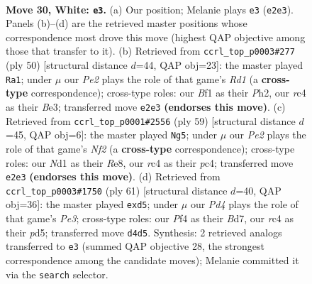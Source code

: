 \documentclass[11pt]{article}
\begin{document}
\clearpage

\begin{figure}[p]\centering
\begin{subfigure}{0.46\textwidth}\centering
\resizebox{\linewidth}{!}{%
\newchessgame
\chessboard[
  setfen={6k1/R4pp1/2b1p3/1p5p/1PrPnP1P/6P1/4P3/3N1BK1 w - - 3 30},
  showmover=false,
  pgfstyle=straightmove, color=movearrow, markmove={e2-e3}
]}
\caption{}
\end{subfigure}\hfill
\begin{subfigure}{0.46\textwidth}\centering
\resizebox{\linewidth}{!}{%
\newchessgame
\chessboard[
  setfen={1r4k1/2N1bpp1/4p3/2n1P2p/2p5/4B1P1/1P2PP1P/3R2K1 w - - 1 26},
  showmover=false,
  pgfstyle=straightmove, color=movearrow, markmove={d1-a1}
]}
\caption{}
\end{subfigure}
\\[4pt]
\begin{subfigure}{0.46\textwidth}\centering
\resizebox{\linewidth}{!}{%
\newchessgame
\chessboard[
  setfen={4r3/1bk2np1/pp3p1p/8/1PP5/2K4P/6P1/R4BB1 b - - 5 30},
  showmover=false,
  pgfstyle=straightmove, color=movearrow, markmove={f7-g5}
]}
\caption{}
\end{subfigure}\hfill
\begin{subfigure}{0.46\textwidth}\centering
\resizebox{\linewidth}{!}{%
\newchessgame
\chessboard[
  setfen={r2k4/3b2p1/4p3/1pRPPp1p/4pP2/1B6/P2K2PP/8 b - - 0 31},
  showmover=false,
  pgfstyle=straightmove, color=movearrow, markmove={e6-d5}
]}
\caption{}
\end{subfigure}
\caption{\textbf{Move 30, White: \texttt{e3}.} (a) Our position; Melanie plays \texttt{e3} (\texttt{e2e3}). Panels (b)--(d) are the retrieved master positions whose correspondence most drove this move (highest QAP objective among those that transfer to it). (b) Retrieved from \texttt{ccrl\_top\_p0003\#277} (ply 50) [structural distance $d$=44, QAP obj=23]: the master played \texttt{Ra1}; under $\mu$ our \emph{Pe2} plays the role of that game's \emph{Rd1} (a \textbf{cross-type} correspondence); cross-type roles: our \emph{B}f1 as their \emph{P}h2, our \emph{r}c4 as their \emph{B}e3; transferred move \texttt{e2e3} \textbf{(endorses this move)}. (c) Retrieved from \texttt{ccrl\_top\_p0001\#2556} (ply 59) [structural distance $d$=45, QAP obj=6]: the master played \texttt{Ng5}; under $\mu$ our \emph{Pe2} plays the role of that game's \emph{Nf2} (a \textbf{cross-type} correspondence); cross-type roles: our \emph{N}d1 as their \emph{R}e8, our \emph{r}c4 as their \emph{p}c4; transferred move \texttt{e2e3} \textbf{(endorses this move)}. (d) Retrieved from \texttt{ccrl\_top\_p0003\#1750} (ply 61) [structural distance $d$=40, QAP obj=36]: the master played \texttt{exd5}; under $\mu$ our \emph{Pd4} plays the role of that game's \emph{Pe3}; cross-type roles: our \emph{P}f4 as their \emph{B}d7, our \emph{r}c4 as their \emph{p}d5; transferred move \texttt{d4d5}. Synthesis: 2 retrieved analogs transferred to \texttt{e3} (summed QAP objective 28, the strongest correspondence among the candidate moves); Melanie committed it via the \texttt{search} selector.}
\label{fig:thought-m58}
\end{figure}
\end{document}
